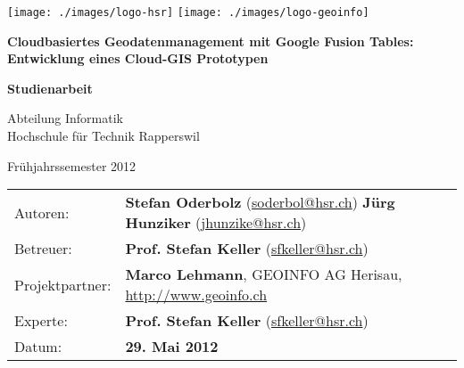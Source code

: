 \begin{titlepage}

\texttt{[image: ./images/logo-hsr]}
\hfill
\texttt{[image: ./images/logo-geoinfo]}
\vspace{2.2cm}

\begin{center}
{ \Large
	\textbf{Cloudbasiertes Geodatenmanagement mit Google Fusion Tables: Entwicklung eines Cloud-GIS Prototypen}
	\vspace{1cm}

	\textbf{Studienarbeit}
	\vspace{1cm}

	Abteilung Informatik \\[0.2cm]
	Hochschule für Technik Rapperswil
	\vspace{1cm}

	Frühjahrssemester 2012
}
\end{center}
\vspace{2.3cm}

\begin{tabular}{p{0.19\twocelltabwidth}p{0.81\twocelltabwidth}}
Autoren: & \textbf{Stefan Oderbolz} (\url{soderbol@hsr.ch}) \newline
 \textbf{Jürg Hunziker} (\url{jhunzike@hsr.ch}) \\ 
Betreuer: & \textbf{Prof. Stefan Keller} (\url{sfkeller@hsr.ch}) \\ 
Projektpartner: & \textbf{Marco Lehmann}, GEOINFO AG Herisau, \url{http://www.geoinfo.ch} \\ 
Experte: & \textbf{Prof. Stefan Keller} (\url{sfkeller@hsr.ch}) \\ 
Datum: & \textbf{29. Mai 2012} \\ 
\end{tabular}

\end{titlepage}
